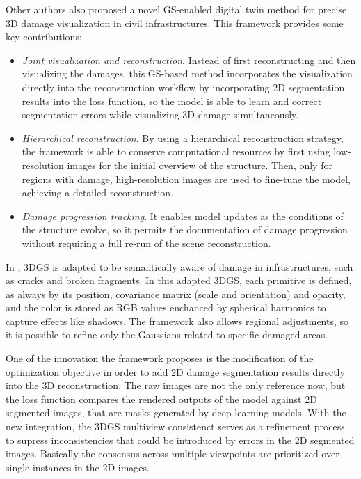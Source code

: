 \documentclass[
	a4paper, %
	10pt, %
	unnumberedsections, %
	twoside, %
]{LTJournalArticle}
\begin{document}
Other authors also proposed a novel GS-enabled digital twin method \cite{digitaltwin_damage} for precise 3D damage visualization in civil infrastructures. This framework provides some key contributions:
\begin{itemize}
	\item \textit{Joint visualization and reconstruction}. Instead of first reconstructing and then visualizing the damages, this GS-based method incorporates the visualization directly into the reconstruction workflow by incorporating 2D segmentation results into the loss function, so the model is able to learn and correct segmentation errors while visualizing 3D damage simultaneously.
	\item \textit{Hierarchical reconstruction}. By using a hierarchical reconstruction strategy, the framework is able to conserve computational resources by first using low-resolution images for the initial overview of the structure. Then, only for regions with damage, high-resolution images are used to fine-tune the model, achieving a detailed reconstruction.
	\item \textit{Damage progression tracking}. It enables model updates  as the conditions of the structure evolve, so it permits the documentation of damage progression without requiring a full re-run of the scene reconstruction.
\end{itemize}

In \cite{digitaltwin_damage}, 3DGS is adapted to be semantically aware of damage in infrastructures, such as cracks and broken fragments. In this adapted 3DGS, each primitive is defined, as always by its position, covariance matrix (scale and orientation) and opacity, and the color is stored as RGB values enchanced by spherical harmonics to capture effects like shadows. The framework also allows regional adjustments, so it is possible to refine only the Gaussians related to specific damaged areas.

One of the innovation the framework proposes is the modification of the optimization objective in order to add 2D damage segmentation results directly into the 3D reconstruction. The raw images are not the only reference now, but the loss function compares the rendered outputs of the model against 2D segmented images, that are masks generated by deep learning models. With the new integration, the 3DGS multiview consistenct serves as a refinement process to supress inconsistencies that could be introduced by errors in the 2D segmented images. Basically the consensus across multiple viewpoints are prioritized over single instances in the 2D images. 
\end{document}
